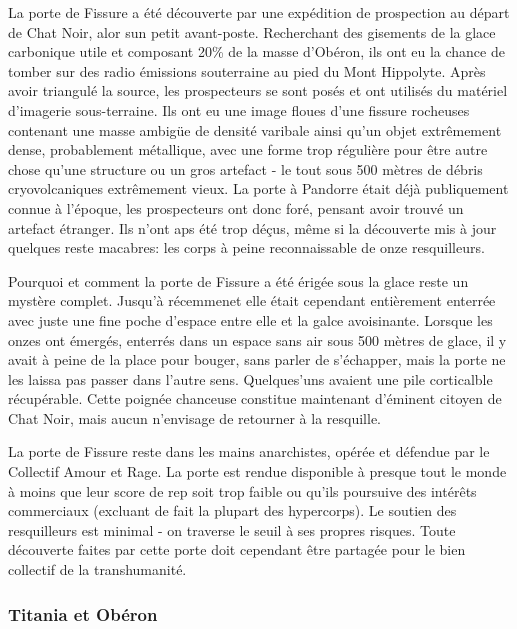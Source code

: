                                                                      La porte de Fissure a été découverte par une expédition de prospection au départ de Chat Noir, alor sun petit avant-poste. Recherchant des gisements de la glace carbonique utile et composant 20\% de la masse d'Obéron, ils ont eu la chance de tomber sur des radio émissions souterraine au pied du Mont Hippolyte. Après avoir triangulé la source, les prospecteurs se sont posés et ont utilisés du matériel d'imagerie sous-terraine. Ils ont eu une image floues d'une fissure rocheuses contenant une masse ambigüe de densité varibale ainsi qu'un objet extrêmement dense, probablement métallique, avec une forme trop régulière pour être autre chose qu'une structure ou un gros artefact - le tout sous 500 mètres de débris cryovolcaniques extrêmement vieux. La porte à Pandorre était déjà publiquement connue à l'époque, les prospecteurs ont donc foré, pensant avoir trouvé un artefact étranger. Ils n'ont aps été trop déçus, même si la découverte mis à jour quelques reste macabres: les corps à peine reconnaissable de onze resquilleurs. 

                                                                     Pourquoi et comment la porte de Fissure a été érigée sous la glace reste un mystère complet. Jusqu'à récemmenet elle était cependant entièrement enterrée avec juste une fine poche d'espace entre elle et la galce avoisinante. Lorsque les onzes ont émergés, enterrés dans un espace sans air sous 500 mètres de glace, il y avait à peine de la place pour bouger, sans parler de s'échapper, mais la porte ne les laissa pas passer dans l'autre sens. Quelques'uns avaient une pile corticalble récupérable. Cette poignée chanceuse constitue maintenant d'éminent citoyen de Chat Noir, mais aucun n'envisage de retourner à la resquille. 

                                                                     La porte de Fissure reste dans les mains anarchistes, opérée et défendue par le Collectif Amour et Rage. La porte est rendue disponible à presque tout le monde à moins que leur score de rep soit trop faible ou qu'ils poursuive des intérêts commerciaux (excluant de fait la plupart des hypercorps). Le soutien des resquilleurs est minimal - on traverse le seuil à ses propres risques. Toute découverte faites par cette porte doit cependant être partagée pour le bien collectif de la transhumanité. 

                                                                     \subsubsection{Titania et Obéron} \label{sec:titania-oberon} 

